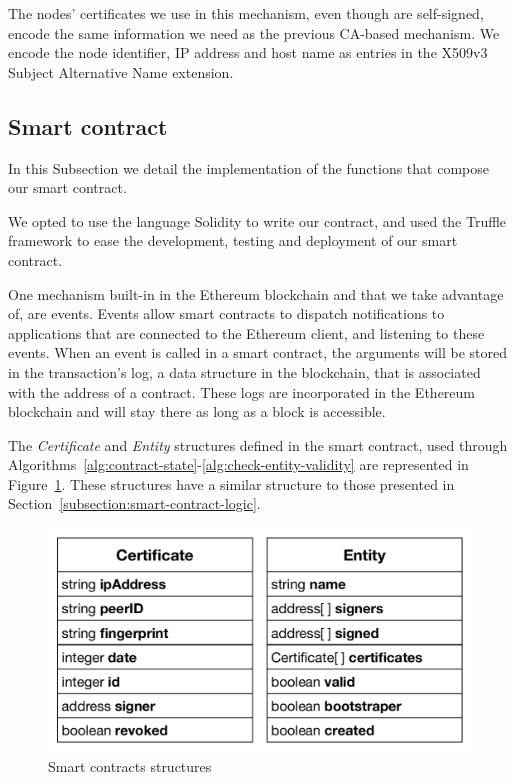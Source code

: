 The nodes' certificates we use in this mechanism, even though are self-signed, encode the same information we need as the previous CA-based mechanism.
We encode the node identifier, IP address and host name as entries in the X509v3 Subject Alternative Name extension.

\subsection{Smart contract}\label{subsection:smart-contract}

In this Subsection we detail the implementation of the functions that compose our smart contract.

We opted to use the language Solidity to write our contract, and used the Truffle framework to ease the development, testing and deployment of our smart contract.

One mechanism built-in in the Ethereum blockchain and that we take advantage of, are events.
Events allow smart contracts to dispatch notifications to applications that are connected to the Ethereum client, and listening to these events.
When an event is called in a smart contract, the arguments will be stored in the transaction's log, a data structure in the blockchain, that is associated with the address of a contract.
These logs are incorporated in the Ethereum blockchain and will stay there as long as a block is accessible.

The \textit{Certificate} and \textit{Entity} structures defined in the smart contract, used through Algorithms~\ref{alg:contract-state}-\ref{alg:check-entity-validity} are represented in Figure~\ref{fig:implemented-structures}.
These structures have a similar structure to those presented in Section~\ref{subsection:smart-contract-logic}.

\begin{figure}[htb]
  \centering
  \includegraphics[scale=0.5]{Figures/implementation-structures.pdf}
  \caption{Smart contracts structures}
\label{fig:implemented-structures}
\end{figure}

